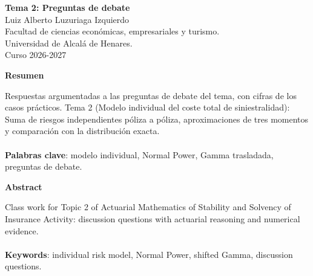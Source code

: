 \documentclass[a4paper,12pt]{article}
\begin{document}
\begin{titlepage}
    \centering
    \vspace*{0.1cm}
    \huge\textbf{Tema 2: Preguntas de debate}\\
    \vspace{1cm}
    \small{Luiz Alberto Luzuriaga Izquierdo}\\
    \vspace{0.1cm}
    Facultad de ciencias económicas, empresariales y turismo. \\
    \vspace{0.1cm}
    Universidad de Alcalá de Henares. \\
    \vspace{0.1cm}
    Curso 2026-2027\\
    \vspace{0.5cm}

{\bfseries Resumen}

\vspace{0.1cm}
\noindent
\begin{justify}
Respuestas argumentadas a las preguntas de debate del tema, con cifras de los casos prácticos. Tema 2 (Modelo individual del coste total de siniestralidad): Suma de riesgos independientes póliza a póliza, aproximaciones de tres momentos y comparación con la distribución exacta.\\\\
\vspace{0.1cm}
\noindent
\textbf{Palabras clave}: modelo individual, Normal Power, Gamma trasladada, preguntas de debate.
\end{justify}
\begin{center}
    {\bfseries Abstract}
\end{center}
\vspace{0.1cm}
\noindent
\begin{justify}
Class work for Topic 2 of Actuarial Mathematics of Stability and Solvency of Insurance Activity: discussion questions with actuarial reasoning and numerical evidence.\\\\
\vspace{0.1cm}
\noindent
\textbf{Keywords}: individual risk model, Normal Power, shifted Gamma, discussion questions.
\end{justify}

\end{titlepage}

\newpage{}
\renewcommand{\contentsname}{Índice}
\tableofcontents
\end{document}
